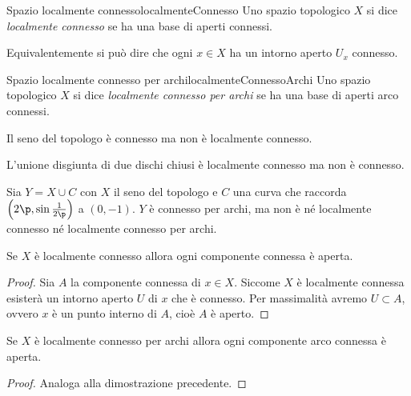\begin{defn}{Spazio localmente connesso}{localmenteConnesso}
	Uno spazio topologico \(X\) si dice \emph{localmente connesso} se ha una base di aperti connessi.
\end{defn}

\begin{oss}
	Equivalentemente si può dire che ogni \(x\in X\) ha un intorno aperto \(U_x\) connesso.
\end{oss}

\begin{defn}{Spazio localmente connesso per archi}{localmenteConnessoArchi}
	Uno spazio topologico \(X\) si dice \emph{localmente connesso per archi} se ha una base di aperti arco connessi.
\end{defn}

\begin{ese}
	Il seno del topologo è connesso ma non è localmente connesso.
\end{ese}

\begin{ese}
	L'unione disgiunta di due dischi chiusi è localmente connesso ma non è connesso.
\end{ese}

\begin{ese}
	Sia \(Y=X\cup C\) con \(X\) il seno del topologo e \(C\) una curva che raccorda \(\left( 2\p,\sin \frac{1}{2\p} \right)\) a \((0,-1)\).
	\(Y\) è connesso per archi, ma non è né localmente connesso né localmente connesso per archi.
\end{ese}

\begin{pr}\label{pr:compConn6}
	Se \(X\) è localmente connesso allora ogni componente connessa è aperta.
\end{pr}

\begin{proof}
	Sia \(A\) la componente connessa di \(x\in X\).
	Siccome \(X\) è localmente connessa esisterà un intorno aperto \(U\) di \(x\) che è connesso.
	Per massimalità avremo \(U\subset A\), ovvero \(x\) è un punto interno di \(A\), cioè \(A\) è aperto.
\end{proof}

\begin{pr}\label{pr:compConn7}
	Se \(X\) è localmente connesso per archi allora ogni componente arco connessa è aperta.
\end{pr}

\begin{proof}
	Analoga alla dimostrazione precedente.
\end{proof}

